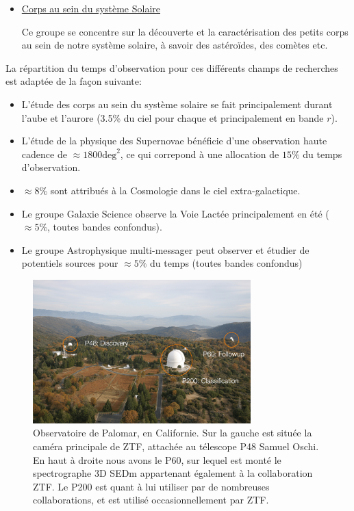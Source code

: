 \documentclass[../main/main.tex]{subfiles}
\begin{document}
\begin{itemize}[label=$\bullet$]
    \item \underline{Corps au sein du système Solaire}

      Ce groupe se concentre sur la découverte et la caractérisation des
      petits corps au sein de notre système solaire, à savoir des
      astéroïdes, des comètes etc.
\end{itemize}

La répartition du temps d'observation pour ces différents champs de
recherches est adaptée de la façon suivante:

\begin{itemize}[label=$\diamondsuit$]
  \itemsep0em 
\item L'étude des corps au sein
  du système solaire se fait principalement durant l'aube et l'aurore
  (3.5\% du ciel pour chaque et principalement en bande $r$).
\item L'étude de la physique des Supernovae bénéficie d'une observation
  haute cadence de $\approx1800\text{deg}^{2}$, ce qui correpond à une
  allocation de $15\%$ du temps d'observation. 
\item  $\approx8\%$ sont attribués à la Cosmologie dans le ciel extra-galactique.
\item Le groupe Galaxie Science observe la Voie Lactée principalement en
  été ($\approx5\%$, toutes bandes confondus).
\item Le groupe Astrophysique multi-messager peut observer et étudier de
  potentiels sources pour $\approx5\%$ du temps (toutes bandes confondus)
\end{itemize}

\begin{figure}[h]
  \centering
  \includegraphics[width=0.75\textwidth]{../figures/02_ztf/palomar_obs-min.png}
  \caption[Observatoire de Palomar]{Observatoire de Palomar, en Californie. Sur la gauche est
    située la caméra principale de ZTF, attachée au télescope P48 Samuel
    Oschi. En haut à droite nous avons le P60, sur lequel est monté le
    spectrographe 3D SEDm appartenant également à la collaboration
    ZTF. Le P200 est quant à lui utiliser par de nombreuses
    collaborations, et est utilisé occasionnellement par ZTF.}
\label{fig:palomar_obs}
\end{figure}
\end{document}
